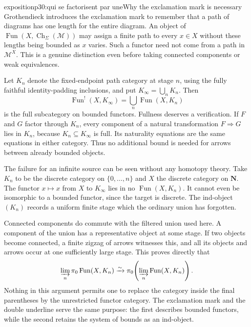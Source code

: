 \begin{dcomment}{exposition}{p30:qui se factorisent par une}{Why the exclamation mark is necessary}
Grothendieck introduces the exclamation mark to remember that a path of diagrams has one length for the entire diagram. An object of $\operatorname{Fun}(X,\operatorname{Ch}_\Sigma(\mathcal M))$ may assign a finite path to every $x\in X$ without these lengths being bounded as $x$ varies. Such a functor need not come from a path in $\mathcal M^X$. This is a genuine distinction even before taking connected components or weak equivalences.

Let $K_n$ denote the fixed-endpoint path category at stage $n$, using the fully faithful identity-padding inclusions, and put $K_\infty=\bigcup_nK_n$. Then
\[
 \operatorname{Fun}^{!}(X,K_\infty)
   =\bigcup_n\operatorname{Fun}(X,K_n)
\]
is the full subcategory on bounded functors. Fullness deserves a verification. If $F$ and $G$ factor through $K_n$, every component of a natural transformation $F\Rightarrow G$ lies in $K_n$, because $K_n\subseteq K_\infty$ is full. Its naturality equations are the same equations in either category. Thus no additional bound is needed for arrows between already bounded objects.

The failure for an infinite source can be seen without any homotopy theory. Take $K_n$ to be the discrete category on $\{0,\ldots,n\}$ and $X$ the discrete category on $\mathbf N$. The functor $x\mapsto x$ from $X$ to $K_\infty$ lies in no $\operatorname{Fun}(X,K_n)$. It cannot even be isomorphic to a bounded functor, since the target is discrete. The ind-object $(K_n)$ records a uniform finite stage which the ordinary union has forgotten.

Connected components do commute with the filtered union used here. A component of the union has a representative object at some stage. If two objects become connected, a finite zigzag of arrows witnesses this, and all its objects and arrows occur at one sufficiently large stage. This proves directly that
\[
 \varinjlim_n\pi_0\operatorname{Fun}(X,K_n)
 \xrightarrow{\sim}
 \pi_0\!\left(\varinjlim_n\operatorname{Fun}(X,K_n)\right).
\]
Nothing in this argument permits one to replace the category inside the final parentheses by the unrestricted functor category. The exclamation mark and the double underline serve the same purpose: the first describes bounded functors, while the second retains the system of bounds as an ind-object.
\end{dcomment}

